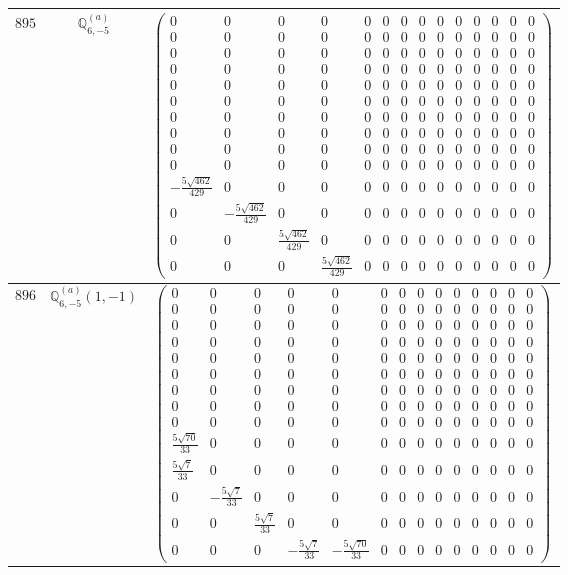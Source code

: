 \documentclass[fleqn,8pt,landscape]{jsarticle}
\begin{document}
\begin{center}
\begin{longtable}{ccc}
$ 895 $ & $ \mathbb{Q}_{6,-5}^{(a)} $ & $ \begin{pmatrix} 0 & 0 & 0 & 0 & 0 & 0 & 0 & 0 & 0 & 0 & 0 & 0 & 0 & 0 \\ 0 & 0 & 0 & 0 & 0 & 0 & 0 & 0 & 0 & 0 & 0 & 0 & 0 & 0 \\ 0 & 0 & 0 & 0 & 0 & 0 & 0 & 0 & 0 & 0 & 0 & 0 & 0 & 0 \\ 0 & 0 & 0 & 0 & 0 & 0 & 0 & 0 & 0 & 0 & 0 & 0 & 0 & 0 \\ 0 & 0 & 0 & 0 & 0 & 0 & 0 & 0 & 0 & 0 & 0 & 0 & 0 & 0 \\ 0 & 0 & 0 & 0 & 0 & 0 & 0 & 0 & 0 & 0 & 0 & 0 & 0 & 0 \\ 0 & 0 & 0 & 0 & 0 & 0 & 0 & 0 & 0 & 0 & 0 & 0 & 0 & 0 \\ 0 & 0 & 0 & 0 & 0 & 0 & 0 & 0 & 0 & 0 & 0 & 0 & 0 & 0 \\ 0 & 0 & 0 & 0 & 0 & 0 & 0 & 0 & 0 & 0 & 0 & 0 & 0 & 0 \\ 0 & 0 & 0 & 0 & 0 & 0 & 0 & 0 & 0 & 0 & 0 & 0 & 0 & 0 \\ - \frac{5 \sqrt{462}}{429} & 0 & 0 & 0 & 0 & 0 & 0 & 0 & 0 & 0 & 0 & 0 & 0 & 0 \\ 0 & - \frac{5 \sqrt{462}}{429} & 0 & 0 & 0 & 0 & 0 & 0 & 0 & 0 & 0 & 0 & 0 & 0 \\ 0 & 0 & \frac{5 \sqrt{462}}{429} & 0 & 0 & 0 & 0 & 0 & 0 & 0 & 0 & 0 & 0 & 0 \\ 0 & 0 & 0 & \frac{5 \sqrt{462}}{429} & 0 & 0 & 0 & 0 & 0 & 0 & 0 & 0 & 0 & 0 \end{pmatrix} $ \\ \hline
$ 896 $ & $ \mathbb{Q}_{6,-5}^{(a)}(1,-1) $ & $ \begin{pmatrix} 0 & 0 & 0 & 0 & 0 & 0 & 0 & 0 & 0 & 0 & 0 & 0 & 0 & 0 \\ 0 & 0 & 0 & 0 & 0 & 0 & 0 & 0 & 0 & 0 & 0 & 0 & 0 & 0 \\ 0 & 0 & 0 & 0 & 0 & 0 & 0 & 0 & 0 & 0 & 0 & 0 & 0 & 0 \\ 0 & 0 & 0 & 0 & 0 & 0 & 0 & 0 & 0 & 0 & 0 & 0 & 0 & 0 \\ 0 & 0 & 0 & 0 & 0 & 0 & 0 & 0 & 0 & 0 & 0 & 0 & 0 & 0 \\ 0 & 0 & 0 & 0 & 0 & 0 & 0 & 0 & 0 & 0 & 0 & 0 & 0 & 0 \\ 0 & 0 & 0 & 0 & 0 & 0 & 0 & 0 & 0 & 0 & 0 & 0 & 0 & 0 \\ 0 & 0 & 0 & 0 & 0 & 0 & 0 & 0 & 0 & 0 & 0 & 0 & 0 & 0 \\ 0 & 0 & 0 & 0 & 0 & 0 & 0 & 0 & 0 & 0 & 0 & 0 & 0 & 0 \\ \frac{5 \sqrt{70}}{33} & 0 & 0 & 0 & 0 & 0 & 0 & 0 & 0 & 0 & 0 & 0 & 0 & 0 \\ \frac{5 \sqrt{7}}{33} & 0 & 0 & 0 & 0 & 0 & 0 & 0 & 0 & 0 & 0 & 0 & 0 & 0 \\ 0 & - \frac{5 \sqrt{7}}{33} & 0 & 0 & 0 & 0 & 0 & 0 & 0 & 0 & 0 & 0 & 0 & 0 \\ 0 & 0 & \frac{5 \sqrt{7}}{33} & 0 & 0 & 0 & 0 & 0 & 0 & 0 & 0 & 0 & 0 & 0 \\ 0 & 0 & 0 & - \frac{5 \sqrt{7}}{33} & - \frac{5 \sqrt{70}}{33} & 0 & 0 & 0 & 0 & 0 & 0 & 0 & 0 & 0 \end{pmatrix} $ \\ \hline

\end{longtable}
\end{center}
\end{document}
